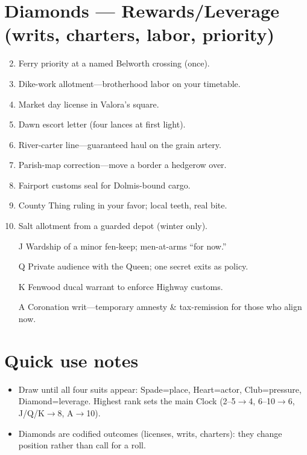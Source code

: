 \section*{Diamonds --- Rewards/Leverage (writs, charters, labor, priority)}
\begin{enumerate}
\setcounter{enumi}{1}
\item Ferry priority at a named Belworth crossing (once).
\item Dike-work allotment---brotherhood labor on your timetable.
\item Market day license in Valora's square.
\item Dawn escort letter (four lances at first light).
\item River-carter line---guaranteed haul on the grain artery.
\item Parish-map correction---move a border a hedgerow over.
\item Fairport customs seal for Dolmis-bound cargo.
\item County Thing ruling in your favor; local teeth, real bite.
\item Salt allotment from a guarded depot (winter only).
\item[J] Wardship of a minor fen-keep; men-at-arms ``for now.''
\item[Q] Private audience with the Queen; one secret exits as policy.
\item[K] Fenwood ducal warrant to enforce Highway customs.
\item[A] Coronation writ---temporary amnesty \& tax-remission for those who align now.
\end{enumerate}

\section*{Quick use notes}
\begin{itemize}
\item Draw until all four suits appear: Spade=place, Heart=actor, Club=pressure, Diamond=leverage. Highest rank sets the main Clock (2--5$\rightarrow$4, 6--10$\rightarrow$6, J/Q/K$\rightarrow$8, A$\rightarrow$10).
\item Diamonds are codified outcomes (licenses, writs, charters): they change position rather than call for a roll.
\end{itemize}
